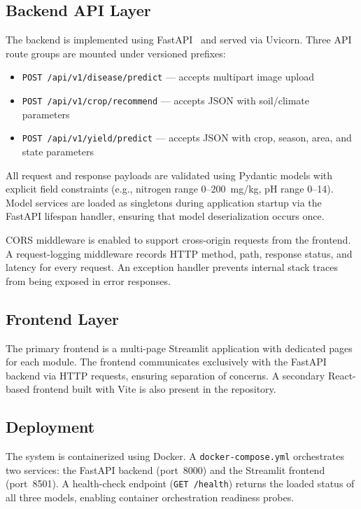 \documentclass[conference]{IEEEtran}
\begin{document}
\subsection{Backend API Layer}
The backend is implemented using FastAPI~\cite{fastapi2019} and served via Uvicorn. Three API route groups are mounted under versioned prefixes:
\begin{itemize}[leftmargin=*]
  \item \texttt{POST /api/v1/disease/predict} --- accepts multipart image upload
  \item \texttt{POST /api/v1/crop/recommend} --- accepts JSON with soil/climate parameters
  \item \texttt{POST /api/v1/yield/predict} --- accepts JSON with crop, season, area, and state parameters
\end{itemize}

All request and response payloads are validated using Pydantic models with explicit field constraints (e.g., nitrogen range 0--200~mg/kg, pH range 0--14). Model services are loaded as singletons during application startup via the FastAPI lifespan handler, ensuring that model deserialization occurs once.

CORS middleware is enabled to support cross-origin requests from the frontend. A request-logging middleware records HTTP method, path, response status, and latency for every request. An exception handler prevents internal stack traces from being exposed in error responses.

\subsection{Frontend Layer}
The primary frontend is a multi-page Streamlit application with dedicated pages for each module. The frontend communicates exclusively with the FastAPI backend via HTTP requests, ensuring separation of concerns. A secondary React-based frontend built with Vite is also present in the repository.

\subsection{Deployment}
The system is containerized using Docker. A \texttt{docker-compose.yml} orchestrates two services: the FastAPI backend (port~8000) and the Streamlit frontend (port~8501). A health-check endpoint (\texttt{GET /health}) returns the loaded status of all three models, enabling container orchestration readiness probes.
\end{document}
